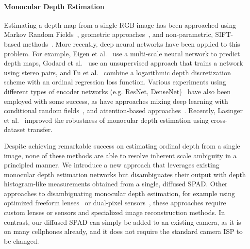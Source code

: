 

\paragraph{Monocular Depth Estimation}
%
Estimating a depth map from a single RGB image has been approached using Markov Random Fields~\cite{Saxena2006}, geometric approaches~\cite{Hoiem2005}, and non-parametric, SIFT-based methods~\cite{Karsch2014}. More recently, deep neural networks have been applied to this problem. For example, Eigen et al.~\cite{Eigen2014} use a multi-scale neural network to
predict depth maps, Godard et al.~\cite{Godard2017} use an unsupervised approach that trains a network using stereo pairs, and Fu et al.~\cite{Fu2018} combine a logarithmic depth discretization scheme with an ordinal regression loss function. Various experiments using different types of encoder networks (e.g. ResNet, DenseNet)~\cite{Laina2016,Alhashim2018} have also been employed with some success, as have approaches mixing deep learning with conditional random fields~\cite{Xu2017}, and attention-based approaches~\cite{Xu2018,Hao2018}. Recently, Lasinger et al.~\cite{Lasinger:2019} improved the robustness of monocular depth estimation using cross-dataset transfer.

Despite achieving remarkable success on estimating ordinal depth from a single image, none of these methods are able to resolve inherent scale ambiguity in a principled manner. We introduce a new approach that leverages existing monocular depth estimation networks but disambiguates their output with depth histogram-like measurements obtained from a single, diffused SPAD. Other approaches to disambiguating monocular depth estimation, for example using optimized freeform lenses~\cite{Wu:2019,Chang:2019:DeepOptics3D} or dual-pixel sensors~\cite{Garg:2019}, these approaches require custom lenses or sensors and specialized image reconstruction methods. In contrast, our diffused SPAD can simply be added to an existing camera, as it is on many cellphones already, and it does not require the standard camera ISP to be changed.

